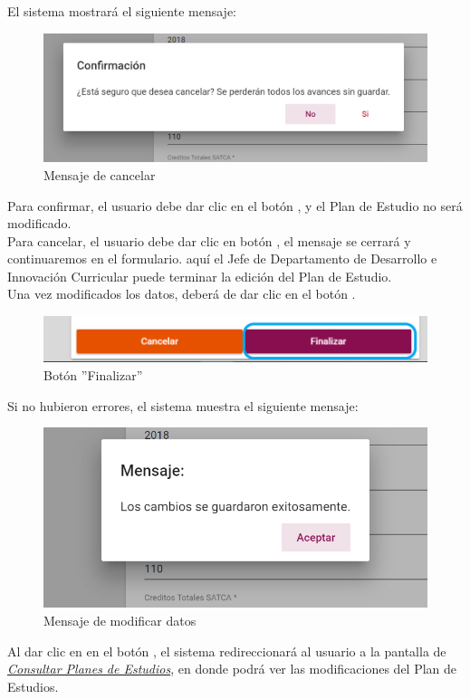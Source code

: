 El sistema mostrará el siguiente mensaje:
\begin{figure}[!hbtp]
	\centering
	\hypertarget{ms1}{\includegraphics[width=0.7\linewidth]{images/SP4-GPE/m1}}
	\caption{Mensaje de cancelar}
	\label{ms1}
\end{figure}

Para confirmar, el usuario debe dar clic en el botón  , y el Plan de Estudio no será modificado.\\

Para cancelar, el usuario debe dar clic en botón  , el mensaje se cerrará y continuaremos en el formulario. aquí el Jefe de Departamento de Desarrollo e Innovación Curricular puede terminar la edición del Plan de Estudio.\\

Una vez modificados los datos, deberá de dar clic en el botón  .
\begin{figure}[!hbtp]
	\centering
	\hypertarget{btnfin}{\includegraphics[width=0.7\linewidth]{images/SP4-GPE/editarPER}}
	\caption{Botón ''Finalizar''}
	\label{btnfin}
\end{figure}

Si no hubieron errores, el sistema muestra el siguiente mensaje:
\begin{figure}[!hbtp]
	\centering
	\hypertarget{ms2}{\includegraphics[width=0.7\linewidth]{images/SP4-GPE/m2}}
	\caption{Mensaje de modificar datos}
	\label{ms2}
\end{figure}


Al dar clic en en el botón  , el sistema redireccionará al usuario a la pantalla de \hyperlink{consultarPE}{\textit{Consultar Planes de Estudios}}, en donde podrá ver las modificaciones del Plan de Estudios.\\
\newpage
